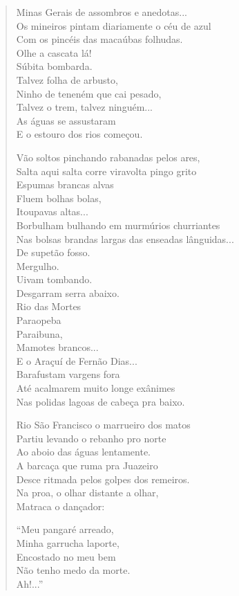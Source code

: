 \begin{verse}
Minas Gerais de assombros e anedotas...\\
Os mineiros pintam diariamente o céu de azul\\
Com os pincéis das macaúbas folhudas.\\
Olhe a cascata lá!\\
Súbita bombarda.\\
Talvez folha de arbusto,\\
Ninho de teneném que cai pesado,\\
Talvez o trem, talvez ninguém...\\
As águas se assustaram\\
E o estouro dos rios começou.

Vão soltos pinchando rabanadas pelos ares,\\
Salta aqui salta corre viravolta pingo grito\\
Espumas brancas alvas\\
Fluem bolhas bolas,\\
Itoupavas altas...\\
Borbulham bulhando em murmúrios churriantes\\
Nas bolsas brandas largas das enseadas lânguidas...\\
De supetão fosso.\\
\quad\quad\quad\quad{}Mergulho.\\
\quad\quad\quad\quad\quad\quad{}Uivam tombando.\\
Desgarram serra abaixo.\\
Rio das Mortes\\
Paraopeba\\
Paraibuna,\\
Mamotes brancos...\\
E o Araçuí de Fernão Dias...\\
Barafustam vargens fora\\
Até acalmarem muito longe exânimes\\
Nas polidas lagoas de cabeça pra baixo.

Rio São Francisco o marrueiro dos matos\\
Partiu levando o rebanho pro norte\\
Ao aboio das águas lentamente.\\
A barcaça que ruma pra Juazeiro\\
Desce ritmada pelos golpes dos remeiros.\\
Na proa, o olhar distante a olhar,\\
Matraca o dançador:

\quad\quad\quad{}``Meu pangaré arreado,\\
\quad\quad\quad{}Minha garrucha laporte,\\
\quad\quad\quad{}Encostado no meu bem\\
\quad\quad\quad{}Não tenho medo da morte.\\
\quad\quad\quad\quad{}Ah!...''


\end{verse}
